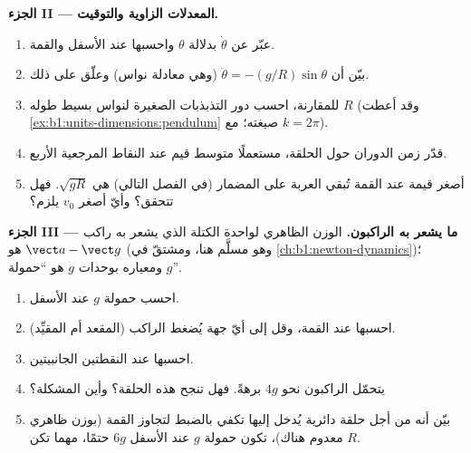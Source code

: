 \begin{problem}
\medskip
\noindent\textbf{الجزء II --- المعدلات الزاوية والتوقيت.}
\begin{enumerate}[resume]
  \item عبّر عن $\dot\theta$ بدلالة $\theta$ واحسبها
        عند الأسفل والقمة.
  \item بيّن أن $\ddot\theta = -(g/R)\sin\theta$ (وهي معادلة
        نواس) وعلّق على ذلك.
  \item للمقارنة، احسب دور التذبذبات الصغيرة لنواس
        بسيط طوله $R$ (وقد أعطت \cref{ex:b1:units-dimensions:pendulum}
        صيغته؛ مع $k = 2\pi$).
  \item قدّر زمن الدوران حول الحلقة، مستعملًا متوسط
        قيم  عند النقاط المرجعية الأربع.
  \item أصغر قيمة  عند القمة تُبقي العربة على المضمار
        (في الفصل التالي) هي $\sqrt{gR}$. فهل تتحقق؟ وأيّ أصغر
        $v_0$ يلزم؟
\end{enumerate}

\medskip
\noindent\textbf{الجزء III --- ما يشعر به الراكبون.}
الوزن الظاهري لواحدة الكتلة الذي يشعر به راكب هو $\vect a - \vect g$
(وهو مسلَّم هنا، ومشتقّ في \cref{ch:b1:newton-dynamics})؛ ومعياره
بوحدات $g$ هو ``حمولة $g$''.
\begin{enumerate}[resume]
  \item احسب حمولة $g$ عند الأسفل.
  \item احسبها عند القمة، وقل إلى أيّ جهة يُضغط الراكب
        (المقعد أم المقيِّد).
  \item احسبها عند النقطتين الجانبيتين.
  \item يتحمّل الراكبون نحو $4g$ برهةً. فهل تنجح هذه الحلقة؟ وأين
        المشكلة؟
  \item بيّن أنه من أجل حلقة دائرية يُدخل إليها  تكفي بالضبط
        لتجاوز القمة (بوزن ظاهري معدوم هناك)، تكون حمولة $g$ عند الأسفل
        $6g$ حتمًا، مهما تكن $R$.
\end{enumerate}


\end{problem}
